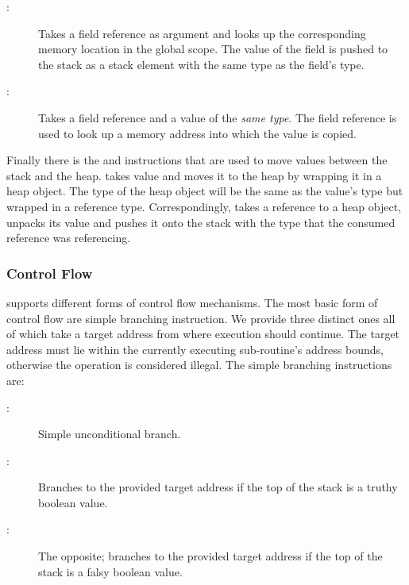 \begin{description}

\item[:]

  Takes a field reference as argument and looks up the corresponding memory
  location in the global scope. The value of the field is pushed to the stack as
  a stack element with the same type as the field's type.

\item[:]

  Takes a field reference and a value of the \emph{same type}. The field
  reference is used to look up a memory address into which the value is copied.

\end{description}

Finally there is the  and  instructions that are used to
move values between the stack and the heap.  takes value and moves it
to the heap by wrapping it in a heap object. The type of the heap object will be
the same as the value's type but wrapped in a reference type. Correspondingly,
 takes a reference to a heap object, unpacks its value and pushes
it onto the stack with the type that the consumed reference was referencing.

\subsubsection{Control Flow}
\label{sec:design:isa:control-flow}

\thename{} supports different forms of control flow mechanisms. The most basic
form of control flow are simple branching instruction. We provide three distinct
ones all of which take a target address from where execution should
continue. The target address must lie within the currently executing
sub-routine's address bounds, otherwise the operation is considered illegal. The
simple branching instructions are:

\begin{description}

\item[:]

  Simple unconditional branch.

\item[:]

  Branches to the provided target address if the top of the stack is a truthy
  boolean value.

\item[:]

  The opposite; branches to the provided target address if the top of the stack
  is a falsy boolean value.

\end{description}

